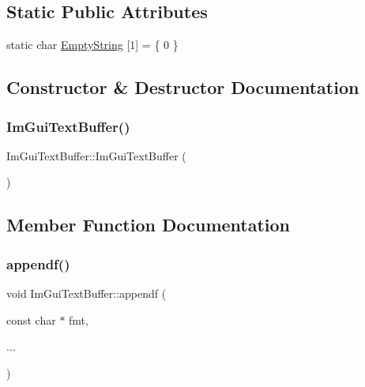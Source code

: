 \subsection*{Static Public Attributes}
\begin{DoxyCompactItemize}
\item 
static char \mbox{\hyperlink{struct_im_gui_text_buffer_a471f810a368ec5f4a8ee12c407330c35}{Empty\+String}} \mbox{[}1\mbox{]} = \{ 0 \}
\end{DoxyCompactItemize}


\subsection{Constructor \& Destructor Documentation}
\mbox{\label{struct_im_gui_text_buffer_a4c4369c5e65f591554428b947c498d0d}} 
\subsubsection{\texorpdfstring{Im\+Gui\+Text\+Buffer()}{ImGuiTextBuffer()}}
{\footnotesize\ttfamily Im\+Gui\+Text\+Buffer\+::\+Im\+Gui\+Text\+Buffer (\begin{DoxyParamCaption}{ }\end{DoxyParamCaption})\hspace{0.3cm}{\ttfamily [inline]}}



\subsection{Member Function Documentation}
\mbox{\label{struct_im_gui_text_buffer_a1c5892db030c5364823793f472754c9e}} 
\subsubsection{\texorpdfstring{appendf()}{appendf()}}
{\footnotesize\ttfamily void Im\+Gui\+Text\+Buffer\+::appendf (\begin{DoxyParamCaption}\item[{const char $\ast$}]{fmt,  }\item[{}]{... }\end{DoxyParamCaption})}

